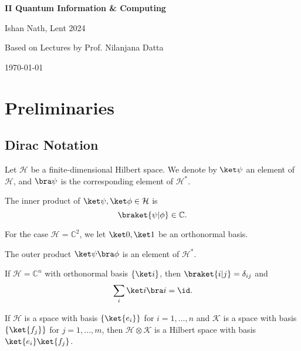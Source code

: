 \documentclass[12pt]{article}
\begin{document}
\hypersetup{pageanchor=false}
\begin{titlepage}
	\begin{center}
		\vspace*{1em}
		\Huge
		\textbf{II Quantum Information \& Computing}

		\vspace{1em}
		\large
		Ishan Nath, Lent 2024

		\vspace{1.5em}

		\Large

		Based on Lectures by Prof. Nilanjana Datta

		\vspace{1em}

		\large
		\today
	\end{center}
	
\end{titlepage}
\hypersetup{pageanchor=true}

\tableofcontents

\newpage

\section{Preliminaries}
\label{sec:pre}

\subsection{Dirac Notation}
\label{sub:dir}

Let $\mathcal{H}$ be a finite-dimensional Hilbert space. We denote by $\ket \psi$ an element of $\mathcal{H}$, and $\bra \psi$ is the corresponding element of $\mathcal{H}^{\ast}$.

The inner product of $\ket \psi, \ket \phi \in \mathcal{H}$ is
\[
	\braket{\psi|\phi} \in \mathbb{C}.
\]

For the case $\mathcal{H} = \mathbb{C}^2$, we let $\ket 0, \ket 1$ be an orthonormal basis.

The outer product $\ket \psi \bra \phi$ is an element of $\mathcal{H}^{\ast}$.

If $\mathcal{H} = \mathbb{C}^n$ with orthonormal basis $\{\ket i\}$, then $\braket{i|j} = \delta_{ij}$ and
\[
\sum_{i} \ket i \bra i = \id.
\]

If $\mathcal{H}$ is a space with basis $\{\ket{e_i}\}$ for $i = 1, \ldots, n$ and $\mathcal{K}$ is a space with basis $\{\ket{f_j}\}$ for $j = 1, \ldots, m$, then $\mathcal{H} \otimes \mathcal{K}$ is a Hilbert space with basis $\ket{e_i} \ket{f_j}$.
\end{document}

